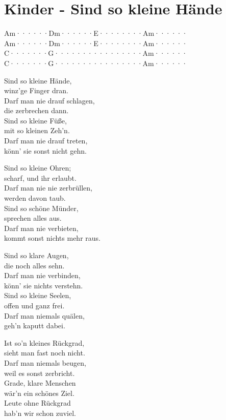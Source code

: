 \documentclass[
  letterpaper,
  a5paper]{memoir}
\begin{document}
\hypertarget{kinder---sind-so-kleine-huxe4nde}{%
\chapter{Kinder - Sind so kleine
Hände}\label{kinder---sind-so-kleine-huxe4nde}}

Am······\textbar Dm······\textbar E········\textbar Am······\textbar{}\\
Am······\textbar Dm······\textbar E········\textbar Am······\textbar{}\\
C·······\textbar G·······\textbar·········\textbar Am······\textbar{}\\
C·······\textbar G·······\textbar·········\textbar Am······\textbar{}

Sind so kleine Hände,\\
winz'ge Finger dran.\\
Darf man nie drauf schlagen,\\
die zerbrechen dann.\\
Sind so kleine Füße,\\
mit so kleinen Zeh'n.\\
Darf man nie drauf treten,\\
könn' sie sonst nicht gehn.

Sind so kleine Ohren;\\
scharf, und ihr erlaubt.\\
Darf man nie nie zerbrüllen,\\
werden davon taub.\\
Sind so schöne Münder,\\
sprechen alles aus.\\
Darf man nie verbieten,\\
kommt sonst nichts mehr raus.

Sind so klare Augen,\\
die noch alles sehn.\\
Darf man nie verbinden,\\
könn' sie nichts verstehn.\\
Sind so kleine Seelen,\\
offen und ganz frei.\\
Darf man niemals quälen,\\
geh'n kaputt dabei.

Ist so'n kleines Rückgrad,\\
sieht man fast noch nicht.\\
Darf man niemals beugen,\\
weil es sonst zerbricht.\\
Grade, klare Menschen\\
wär'n ein schönes Ziel.\\
Leute ohne Rückgrad\\
hab'n wir schon zuviel.
\end{document}
